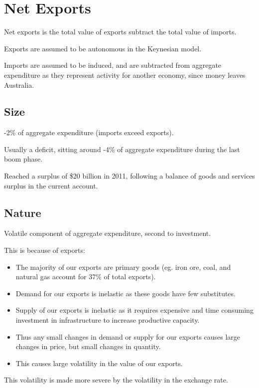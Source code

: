 \documentclass[a4paper,11pt]{article}
\begin{document}
\section{Net Exports}

Net exports is the total value of exports subtract the total value of imports.

Exports are assumed to be autonomous in the Keynesian model.

Imports are assumed to be induced, and are subtracted from aggregate expenditure
as they represent activity for another economy, since money leaves Australia.


\subsection{Size}

-2\% of aggregate expenditure (imports exceed exports).

Usually a deficit, sitting around -4\% of aggregate expenditure during the
last boom phase.

Reached a surplus of \$20 billion in 2011, following a balance of goods and
services surplus in the current account.


\subsection{Nature}

Volatile component of aggregate expenditure, second to investment.

This is because of exports:

\begin{itemize}
\item The majority of our exports are primary goods (eg.  iron ore, coal, and
	natural gas account for 37\% of total exports).
\item Demand for our exports is inelastic as these goods have few substitutes.
\item Supply of our exports is inelastic as it requires expensive and time
	consuming investment in infrastructure to increase productive capacity.
\item Thus any small changes in demand or supply for our exports causes large
	changes in price, but small changes in quantity.
\item This causes large volatility in the value of our exports.
\end{itemize}

This volatility is made more severe by the volatility in the exchange rate.
\end{document}
